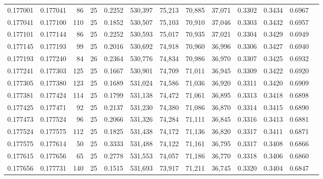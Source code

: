 \begin{tabular}{rrrrrrrrrrrrr}
0.177001 & 0.177041 &    86 &  25 &                                     0.2252 & 530,397 &  75,213 &  70,885 &  37,071 & 0.3302 & 0.3434 & 0.6967 \\
0.177041 & 0.177100 &   110 &  25 &                                     0.1852 & 530,507 &  75,103 &  70,910 &  37,046 & 0.3303 & 0.3432 & 0.6957 \\
0.177101 & 0.177144 &    86 &  25 &                                     0.2252 & 530,593 &  75,017 &  70,935 &  37,021 & 0.3304 & 0.3429 & 0.6949 \\
0.177145 & 0.177193 &    99 &  25 &                                     0.2016 & 530,692 &  74,918 &  70,960 &  36,996 & 0.3306 & 0.3427 & 0.6940 \\
0.177193 & 0.177240 &    84 &  26 &                                     0.2364 & 530,776 &  74,834 &  70,986 &  36,970 & 0.3307 & 0.3425 & 0.6932 \\
0.177241 & 0.177303 &   125 &  25 &                                     0.1667 & 530,901 &  74,709 &  71,011 &  36,945 & 0.3309 & 0.3422 & 0.6920 \\
0.177305 & 0.177380 &   123 &  25 &                                     0.1689 & 531,024 &  74,586 &  71,036 &  36,920 & 0.3311 & 0.3420 & 0.6909 \\
0.177381 & 0.177424 &   114 &  25 &                                     0.1799 & 531,138 &  74,472 &  71,061 &  36,895 & 0.3313 & 0.3418 & 0.6898 \\
0.177425 & 0.177471 &    92 &  25 &                                     0.2137 & 531,230 &  74,380 &  71,086 &  36,870 & 0.3314 & 0.3415 & 0.6890 \\
0.177473 & 0.177524 &    96 &  25 &                                     0.2066 & 531,326 &  74,284 &  71,111 &  36,845 & 0.3316 & 0.3413 & 0.6881 \\
0.177524 & 0.177575 &   112 &  25 &                                     0.1825 & 531,438 &  74,172 &  71,136 &  36,820 & 0.3317 & 0.3411 & 0.6871 \\
0.177575 & 0.177614 &    50 &  25 &                                     0.3333 & 531,488 &  74,122 &  71,161 &  36,795 & 0.3317 & 0.3408 & 0.6866 \\
0.177615 & 0.177656 &    65 &  25 &                                     0.2778 & 531,553 &  74,057 &  71,186 &  36,770 & 0.3318 & 0.3406 & 0.6860 \\
0.177656 & 0.177731 &   140 &  25 &                                     0.1515 & 531,693 &  73,917 &  71,211 &  36,745 & 0.3320 & 0.3404 & 0.6847 \\

\end{tabular}
